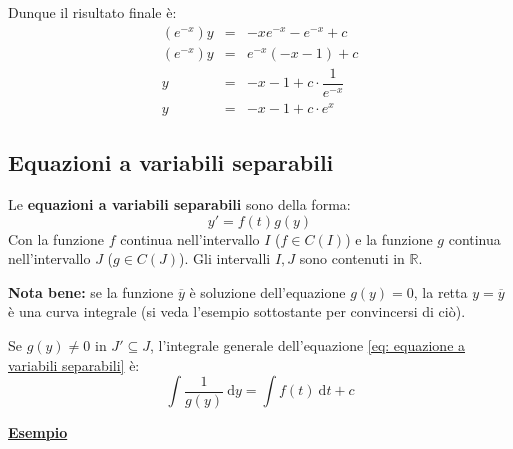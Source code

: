 \documentclass[a4paper]{article}
\newcommand{\definition}[1]{\textcolor{Red3}{\textbf{#1}}}
\newcommand{\example}[1]{\textcolor{Green4}{\textbf{#1}}}
\begin{document}
	Dunque il risultato finale è:
	\begin{equation*}
		\begin{array}{rcl}
			\left(e^{-x}\right) y &=& -x e^{-x} - e^{-x} + c \\ [.3em]
			\left(e^{-x}\right) y &=& e^{-x}\left(-x - 1\right) + c \\ [1em]
			y &=& -x-1 + c \cdot \dfrac{1}{e^{-x}} \\ [1em]
			y &=& -x-1 + c \cdot e^{x}
		\end{array}
	\end{equation*}\newpage


	\subsection{Equazioni a variabili separabili}\label{subsection: equazioni a variabili separabili}

	Le \definition{equazioni a variabili separabili} sono della forma:
	\begin{equation}\label{eq: equazione a variabili separabili}
		y' = f\left(t\right)g\left(y\right)
	\end{equation}
	Con la funzione $f$ continua nell'intervallo $I$ ($f \in C\left(I\right)$) e la funzione $g$ continua nell'intervallo $J$ ($g \in C\left(J\right)$). Gli intervalli $I,J$ sono contenuti in $\mathbb{R}$.\newline

	\noindent
	\textbf{Nota bene:} se la funzione $\overline{y}$ è soluzione dell'equazione $g\left(y\right) = 0$, la retta $y = \overline{y}$ è una curva integrale (si veda l'esempio sottostante per convincersi di ciò).\newline

	\noindent
	Se $g\left(y\right) \ne 0$ in $J' \subseteq J$, l'integrale generale dell'equazione \ref{eq: equazione a variabili separabili} è:
	\begin{equation}\label{eq: integrale generale eq. a variabili separabili}
		\displaystyle\int \dfrac{1}{g\left(y\right)} \:\mathrm{d}y = \int f\left(t\right) \: \mathrm{d}t + c
	\end{equation}

	\begin{flushleft}
		\example{\underline{Esempio}}
	\end{flushleft}
\end{document}
